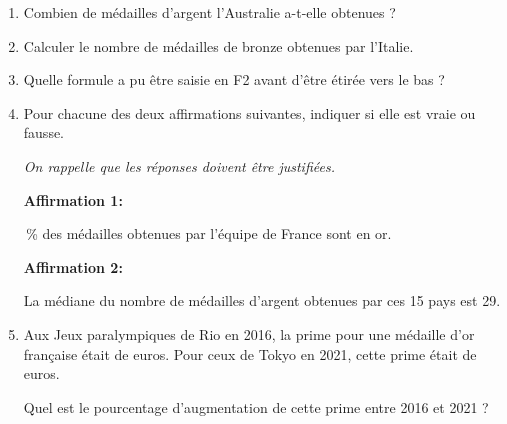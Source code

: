 \documentclass[exercice,a4]{thedocument}%
\begin{document}
\begin{enumerate}
	\item Combien de médailles d’argent l’Australie a-t-elle obtenues ?
	\item Calculer le nombre de médailles de bronze obtenues par l'Italie.
	\item Quelle formule a pu être saisie en \textsf{F2} avant d’être étirée vers le bas ?
	\item Pour chacune des deux affirmations suivantes, indiquer si elle est vraie ou fausse.

	\emph{On rappelle que les réponses doivent être justifiées.}

	\textbf{Affirmation 1:}

	\,\% des médailles obtenues par l’équipe de France sont en or. \fg{}

	\smallskip

	\textbf{Affirmation 2:}

	\og La médiane du nombre de médailles d'argent obtenues par ces 15 pays est 29. \fg{}

	\item Aux Jeux paralympiques de Rio en 2016, la prime pour une médaille d’or française était de  euros. Pour ceux de Tokyo en 2021, cette prime était de  euros.

Quel est le pourcentage d’augmentation de cette prime entre 2016 et 2021 ?

\end{enumerate}

\showthesource
\end{document}
